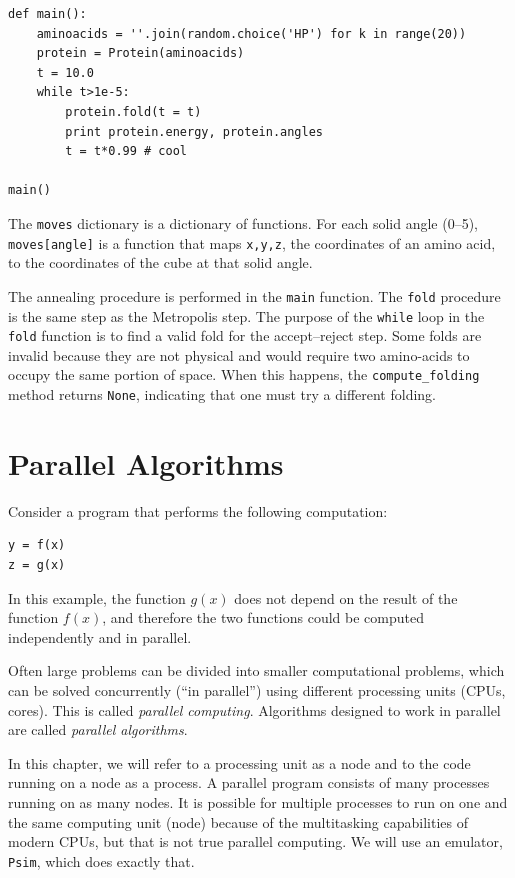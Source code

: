 \documentclass[justified,sixbynine]{tufte-book}
\def\ft{\small\tt}
\theoremstyle{plain}%
\theoremstyle{definition}
\theoremstyle{remark}
\begin{document}
\begin{fullwidth}
\begin{lstlisting}[caption={in file: {\ft folding.py}}]
def main():
    aminoacids = ''.join(random.choice('HP') for k in range(20))
    protein = Protein(aminoacids)
    t = 10.0
    while t>1e-5:
        protein.fold(t = t)
        print protein.energy, protein.angles
        t = t*0.99 # cool

main()
\end{lstlisting}

The {\ft moves} dictionary is a dictionary of functions. For each solid angle (0--5), {\ft moves[angle]} is a function that maps {\ft x,y,z}, the coordinates of an amino acid, to the coordinates of the cube at that solid angle.

The annealing procedure is performed in the {\ft main} function. The {\ft fold} procedure is the same step as the Metropolis step. The purpose of the {\ft while} loop in the {\ft fold} function is to find a valid fold for the accept--reject step. Some folds are invalid because they are not physical and would require two amino-acids to occupy the same portion of space. When this happens, the {\ft compute\_folding} method returns {\ft None}, indicating that one must try a different folding.

\chapter{Parallel Algorithms}

Consider a program that performs the following computation:
\begin{lstlisting}
y = f(x)
z = g(x)
\end{lstlisting}
In this example, the function $g(x)$ does not depend on the result of the function $f(x)$, and therefore the two functions could be computed independently and in parallel.

Often large problems can be divided into smaller computational problems, which can be solved concurrently (``in parallel'') using different processing units (CPUs, cores). This is called {\it parallel computing}. Algorithms designed to work in parallel are called {\it parallel algorithms}.

In this chapter, we will refer to a processing unit as a node and to the code running on a node as a process. A parallel program consists of many processes running on as many nodes. It is possible for multiple processes to run on one and the same computing unit (node) because of the multitasking capabilities of modern CPUs, but that is not true parallel computing. We will use an emulator, {\ft Psim}, which does exactly that.


\end{fullwidth}
\end{document}
